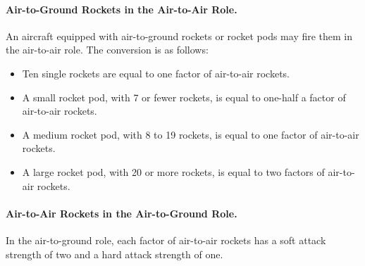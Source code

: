 \begin{advancedrules}
{}{

\paragraph{Air-to-Ground Rockets in the Air-to-Air Role.} An aircraft equipped with air-to-ground rockets or rocket pods may fire them in the air-to-air role. The conversion is as follows:

\begin{itemize}
    \item Ten single rockets are equal to one factor of air-to-air rockets.	
    \item A small rocket pod, with 7 or fewer rockets, is equal to one-half a factor of air-to-air rockets.
    \item A medium rocket pod, with 8 to 19 rockets, is equal to one factor of air-to-air rockets.
    \item A large rocket pod, with 20 or more rockets, is equal to two factors of air-to-air rockets.
\end{itemize}

\paragraph{Air-to-Air Rockets in the Air-to-Ground Role.} In the air-to-ground role, each factor of air-to-air rockets has a soft attack strength of two and a hard attack strength of one.
}




\x{
}
\end{advancedrules}
